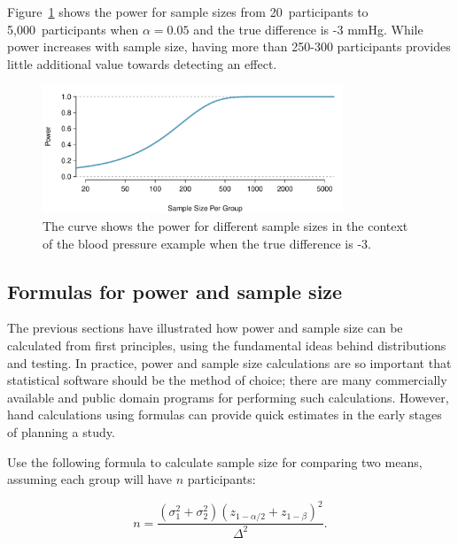 Figure~\ref{power_curve_neg-3} shows the power for sample sizes from 20~participants to 5,000~participants when $\alpha = 0.05$ and the true difference is -3 mmHg. While power increases with sample size, having more than 250-300 participants provides little additional value towards detecting an effect. 

\begin{figure}[h]
\centering
\includegraphics[width=0.80\textwidth]{ch_inference_for_means_oi_biostat/figures/power_curve/power_curve_neg-3}
\caption{The curve shows the power for different sample sizes in the context of the blood pressure example when the true difference is -3.}
\label{power_curve_neg-3}
\end{figure}

\subsection{Formulas for power and sample size}

The previous sections have illustrated how power and sample size can be calculated from first principles, using the fundamental ideas behind distributions and testing. In practice, power and sample size calculations are so important that statistical software should be the method of choice; there are many commercially available and public domain programs for performing such calculations. However, hand calculations using formulas can provide quick estimates in the early stages of planning a study.

Use the following formula to calculate sample size for comparing two means, assuming each group will have $n$ participants:

\[
n = \frac{(\sigma_1^2 + \sigma_2^2)( z_{1-\alpha/2} + z_{1-\beta})^2}
{\Delta^2}.
\]

